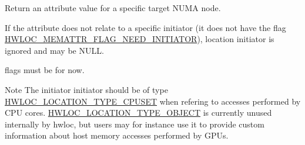 Return an attribute value for a specific target N\+U\+MA node. 

If the attribute does not relate to a specific initiator (it does not have the flag \hyperlink{a00212_gga78aceb4cac4d614c0f5e82dbfeb779e5a9d16523e285b2e22cfc78cc84dce8c96}{H\+W\+L\+O\+C\+\_\+\+M\+E\+M\+A\+T\+T\+R\+\_\+\+F\+L\+A\+G\+\_\+\+N\+E\+E\+D\+\_\+\+I\+N\+I\+T\+I\+A\+T\+OR}), location {\ttfamily initiator} is ignored and may be {\ttfamily N\+U\+LL}.

{\ttfamily flags} must be {} for now.

\begin{DoxyNote}{Note}
The initiator {\ttfamily initiator} should be of type \hyperlink{a00211_gga33099ba58f607fc70925da3777688586a7135318a86361ad75fd1648e6bf6d174}{H\+W\+L\+O\+C\+\_\+\+L\+O\+C\+A\+T\+I\+O\+N\+\_\+\+T\+Y\+P\+E\+\_\+\+C\+P\+U\+S\+ET} when refering to accesses performed by C\+PU cores. \hyperlink{a00211_gga33099ba58f607fc70925da3777688586af637c39b23d48cff15ddb008644aaa84}{H\+W\+L\+O\+C\+\_\+\+L\+O\+C\+A\+T\+I\+O\+N\+\_\+\+T\+Y\+P\+E\+\_\+\+O\+B\+J\+E\+CT} is currently unused internally by hwloc, but users may for instance use it to provide custom information about host memory accesses performed by G\+P\+Us. 
\end{DoxyNote}
